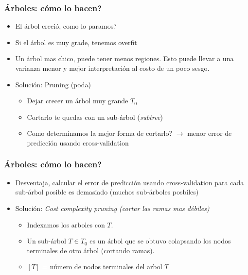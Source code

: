 \documentclass[
  shownotes,
  xcolor={svgnames},
  hyperref={colorlinks,citecolor=DarkBlue,linkcolor=DarkRed,urlcolor=DarkBlue}
  , aspectratio=169]{beamer}
\begin{document}
\begin{frame}[fragile]
\frametitle{Árboles: cómo lo hacen?}
\begin{itemize}
\item El árbol creció, como lo paramos?
\medskip
\item Si el árbol es muy grade, tenemos overfit 
\medskip
\item Un árbol mas chico, puede tener menos regiones. Esto puede llevar a una varianza menor y mejor interpretación al costo de un poco sesgo.
\medskip
\item Solución: Pruning (poda)
\begin{itemize}
 \item Dejar crecer un árbol muy grande $T_0$
 \item Cortarlo te quedas con un sub-árbol ({\it subtree})
 \item Como determinamos la mejor forma de cortarlo? $\rightarrow$ menor error de predicción usando cross-validation
\end{itemize}

\end{itemize}

\end{frame}
\begin{frame}[fragile]
\frametitle{Árboles: cómo lo hacen?}

\begin{itemize}
\item Desventaja, calcular el error de predicción usando cross-validation para cada sub-árbol posible es demasiado (muchos sub-árboles posbiles)
\medskip
\item Solución: {\it Cost complexity pruning (cortar las ramas mas débiles)}
\medskip
\begin{itemize}
    \item Indexamos los arboles con  $T$.
    \medskip
    \item Un sub-árbol $T \in T_0$ es un árbol que se obtuvo colapsando los nodos terminales de otro árbol (cortando ramas).
    \medskip
    \item  $[T]$ = número de nodos terminales del arbol  $T$
\end{itemize}
\end{itemize}
\end{frame}
\end{document}
